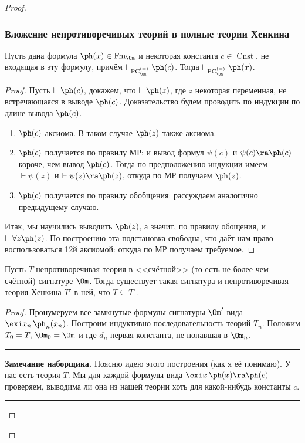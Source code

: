 \documentclass[a4paper,draft]{article}
\def\exis#1{\exi#1\,}
\newenvironment{nbb}{\par\vskip3pt\hrule\vskip3pt\textbf{\footnotesize Замечание наборщика.}\footnotesize }
{\vskip3pt\hrule\par\vskip3pt}
\DeclareMathOperator{\Cnst}{Cnst}
\DeclareMathOperator{\PC}{PC}
\DeclareMathOperator{\Fm}{Fm}
\begin{document}
\begin{proof}
\subsubsection{Вложение непротиворечивых теорий в полные теории Хенкина}
\begin{lemma}
Пусть дана формула $\ph(x)\in\Fm_{\Om}$  и некоторая константа $c\in\Cnst$,
не входящая в эту формулу, причём $\vdash_{\PC_{\Om}^{(=)}}\ph(c)$. Тогда $\vdash_{\PC_{\Om}^{(=)}}\ph(x)$.
\end{lemma}
\begin{proof}
Пусть $\vdash\ph(c)$, докажем, что $\vdash\ph(z)$, где $z$ некоторая переменная, не встречающаяся в выводе $\ph(c)$.
Доказательство будем проводить по индукции по длине вывода $\ph(c)$.
\begin{enumerate}
  \item $\ph(c)$ аксиома. В таком случае $\ph(z)$ также аксиома.
  \item $\ph(c)$ получается по правилу МР:
  и вывод формул $\psi(c)$ и $\psi(c)\ra\ph(c)$ короче, чем вывод $\ph(c)$. Тогда по предположению индукции
  имеем $\vdash\psi(z)$ и $\vdash\psi(z)\ra\ph(z)$, откуда по МР получаем $\ph(z)$.
  \item $\ph(c)$ получается по правилу обобщения: рассуждаем аналогично предыдущему случаю.
\end{enumerate}
Итак, мы научились выводить $\ph(z)$, а значит, по правилу обощения, и $\vdash\forall z\ph(z)$.
По построению эта подстановка свободна, что даёт нам право воспользоваться 12й аксиомой:
откуда по МР получаем требуемое.
\end{proof}
\begin{lemma}
Пусть $T$ непротиворечивая теория в <<счётной>> (то есть не более чем счётной) сигнатуре $\Om$.
Тогда существует такая сигнатура
и непротиворечивая теория Хенкина $T'$ в ней, что $T\subseteq T'.$
\end{lemma}
\begin{proof}
Пронумеруем все замкнутые формулы сигнатуры $\Om'$ вида $\exis{x_n}\ph_n(x_n)$.
Построим индуктивно последовательность теорий $T_n$. Положим $T_0=T,\,\Om_0=\Om$ и
\equ{T_{n+1}=T_n\cup\{\exis x_n\ph_n(x_n)\ra\ph_n(d_n)\},}
где $d_n$ первая константа, не попавшая в $\Om_n$.
\begin{nbb}
Поясню идею этого построения (как я её понимаю). У нас есть теория $T$. Мы для каждой формулы
вида $\exis x\ph(x)\ra\ph(c)$ проверяем, выводима ли она из нашей теории хоть для какой-нибудь константы $c$.

\end{nbb}
\end{proof}
\end{proof}
\end{document}
